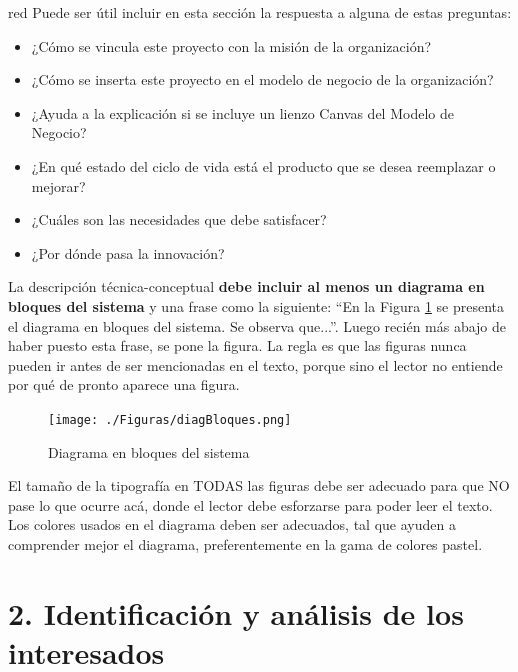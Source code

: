 \documentclass[
11pt, %
codirector, %
]{charter}
\begin{document}
\begin{consigna}{red}
Puede ser útil incluir en esta sección la respuesta a alguna de estas preguntas:

\begin{itemize}
	\item ¿Cómo se vincula este proyecto con la misión de la organización?
	\item ¿Cómo se inserta este proyecto en el modelo de negocio de la organización?
	\item ¿Ayuda a la explicación si se incluye un lienzo Canvas del Modelo de Negocio?
	\item ¿En qué estado del ciclo de vida está el producto que se desea reemplazar o mejorar?
	\item ¿Cuáles son las necesidades que debe satisfacer?
	\item ¿Por dónde pasa la innovación?
\end{itemize}

La descripción técnica-conceptual \textbf{debe incluir al menos un diagrama en bloques del sistema} y una frase como la siguiente: ``En la Figura \ref{fig:diagBloques} se presenta el diagrama en bloques del sistema. Se observa que...''. Luego recién más abajo de haber puesto esta frase, se pone la figura. La regla es que las figuras nunca pueden ir antes de ser mencionadas en el texto, porque sino el lector no entiende por qué de pronto aparece una figura.


\begin{figure}[htpb]
\centering 
\texttt{[image: ./Figuras/diagBloques.png]}
\caption{Diagrama en bloques del sistema}
\label{fig:diagBloques}
\end{figure}

\vspace{25px}

El tamaño de la tipografía en TODAS las figuras debe ser adecuado para que NO pase lo que ocurre acá, donde el lector debe esforzarse para poder leer el texto. Los colores usados en el diagrama deben ser adecuados, tal que ayuden a comprender mejor el diagrama, preferentemente en la gama de colores pastel.
\end{consigna}


\section{2. Identificación y análisis de los interesados}
\label{sec:interesados}
\end{document}
